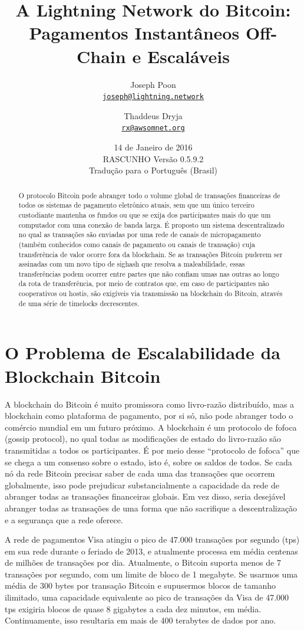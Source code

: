 \documentclass[letterpaper,11pt]{article}
\title{\LARGE A Lightning Network do Bitcoin:\\
	\Large Pagamentos Instantâneos Off-Chain e Escaláveis}
\author{
		Joseph Poon\\
		\small\href{mailto:joseph@lightning.network}
			{\nolinkurl{joseph@lightning.network}}
	\and
		Thaddeus Dryja\\
		\small\href{mailto:rx@awsomnet.org}
			{\nolinkurl{rx@awsomnet.org}}
	}
\date{14 de Janeiro de 2016\\\small RASCUNHO Versão 0.5.9.2 \\ \small Tradução para o Português (Brasil)}
\begin{document}
\maketitle

\begin{abstract}

O protocolo Bitcoin pode abranger todo o volume global de transações financeiras
de todos os sistemas de pagamento eletrônico atuais, sem que um único terceiro
custodiante mantenha os fundos ou que se exija dos participantes mais do que um
computador com uma conexão de banda larga. É proposto um sistema descentralizado
no qual as transações são enviadas por uma rede de canais de micropagamento
(também conhecidos como canais de pagamento ou canais de transação) cuja
transferência de valor ocorre fora da blockchain. Se as transações Bitcoin
puderem ser assinadas com um novo tipo de sighash que resolva a maleabilidade,
essas transferências podem ocorrer entre partes que não confiam umas nas outras
ao longo da rota de transferência, por meio de contratos que, em caso de
participantes não cooperativos ou hostis, são exigíveis via transmissão na
blockchain do Bitcoin, através de uma série de timelocks decrescentes.

\end{abstract}

\section{O Problema de Escalabilidade da Blockchain Bitcoin}

A blockchain do Bitcoin\cite{nakamoto} é muito promissora como livro-razão
distribuído, mas a blockchain como plataforma de pagamento, por si só, não pode
abranger todo o comércio mundial em um futuro próximo. A blockchain é um
protocolo de fofoca (gossip protocol), no qual todas as modificações de estado
do livro-razão são transmitidas a todos os participantes. É por meio desse
``protocolo de fofoca'' que se chega a um consenso sobre o estado, isto é, sobre
os saldos de todos. Se cada nó da rede Bitcoin precisar saber de cada uma das
transações que ocorrem globalmente, isso pode prejudicar substancialmente a
capacidade da rede de abranger todas as transações financeiras globais. Em vez
disso, seria desejável abranger todas as transações de uma forma que não
sacrifique a descentralização e a segurança que a rede oferece.

A rede de pagamentos Visa atingiu o pico de 47.000 transações por segundo (tps)
em sua rede durante o feriado de 2013\cite{visa}, e atualmente processa em média
centenas de milhões de transações por dia. Atualmente, o Bitcoin suporta menos
de 7 transações por segundo, com um limite de bloco de 1 megabyte. Se usarmos
uma média de 300 bytes por transação Bitcoin e supusermos blocos de tamanho
ilimitado, uma capacidade equivalente ao pico de transações da Visa de 47.000
tps exigiria blocos de quase 8 gigabytes a cada dez minutos, em média.
Continuamente, isso resultaria em mais de 400 terabytes de dados por ano.
\end{document}
